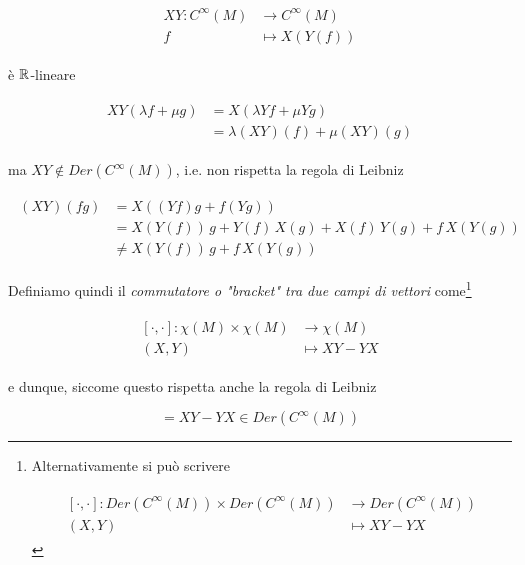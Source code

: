 \begin{align}
	\begin{split}
		X Y : C^{\infty}(M) &\to C^{\infty}(M)\\
		f &\mapsto X(Y(f))
	\end{split}
\end{align}

è $ \mathbb{R} $-lineare

\begin{align}
	\begin{split}
		X Y (\lambda f + \mu g) &= X (\lambda Y f + \mu Y g)\\
		&= \lambda (XY)(f) + \mu (XY)(g)
	\end{split}
\end{align}

ma $ XY \notin Der(C^{\infty}(M)) $, i.e. non rispetta la regola di Leibniz

\begin{align}
	\begin{split}
		(XY)(fg) &= X ((Yf) g + f (Y g))\\
		&= X(Y(f)) \, g + Y(f) \, X(g) + X(f) \, Y(g) + f \, X(Y(g))\\
		&\neq X(Y(f)) \, g + f \, X(Y(g))
	\end{split}
\end{align}

Definiamo quindi il \textit{commutatore o "bracket" tra due campi di vettori} come\footnote{%
	Alternativamente si può scrivere

	\begin{align}
		\begin{split}
			[\cdot,\cdot] : Der(C^{\infty}(M)) \times Der(C^{\infty}(M)) &\to Der(C^{\infty}(M))\\
			(X,Y) &\mapsto XY-YX
		\end{split}
	\end{align}%
}

\begin{align}
	\begin{split}
		[\cdot,\cdot] : \chi(M) \times \chi(M) &\to \chi(M)\\
		(X,Y) &\mapsto XY-YX
	\end{split}
\end{align}

e dunque, siccome questo rispetta anche la regola di Leibniz

\begin{equation}
	[X,Y] = XY-YX \in Der(C^{\infty}(M))
\end{equation}

